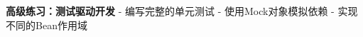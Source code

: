 {{{\textbf{高级练习：测试驱动开发} - 编写完整的单元测试 - 使用Mock对象模拟依赖 - 实现不同的Bean作用域 \hypertarget{ux5e38ux89c1ux95eeux9898ux89e3ux7b54}{%

}}}}
